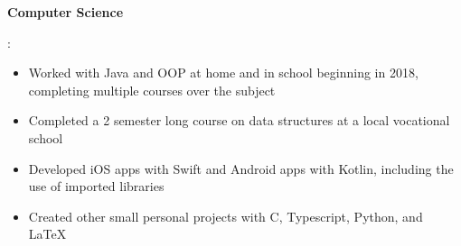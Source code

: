 \documentclass[letterpaper,11pt]{article}
\newcommand{\resumeItem}[2]{
  \item\small{
    \textbf{#1}{: #2 \vspace{-2pt}}
  }
}
\begin{document}
 \resumeItem{Computer Science}
 {
 \begin{itemize}
   \item Worked with Java and OOP at home and in school beginning in 2018, completing multiple courses over the subject
   \item Completed a 2 semester long course on data structures at a local vocational school
   \item Developed iOS apps with Swift and Android apps with Kotlin, including the use of imported libraries
   \item Created other small personal projects with C, Typescript, Python, and LaTeX
 \end{itemize}
 }
\end{document}
